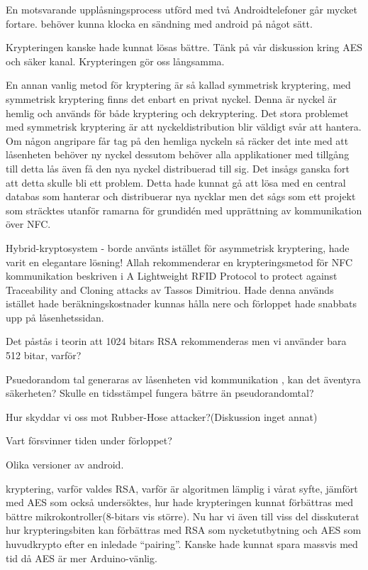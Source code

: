 \documentclass[11pt]{article}
\begin{document}
En motsvarande upplåsningsprocess utförd med två Androidtelefoner går mycket fortare. behöver kunna klocka en sändning med android på något sätt.

Krypteringen kanske hade kunnat lösas bättre. Tänk på vår diskussion kring AES och säker kanal.
Krypteringen gör oss långsamma.

En annan vanlig metod för kryptering är så kallad symmetrisk kryptering, med symmetrisk kryptering finns det enbart en privat nyckel. Denna är nyckel är hemlig och används för både kryptering och dekryptering. Det stora problemet med symmetrisk kryptering är att nyckeldistribution blir väldigt svår att hantera. Om någon angripare får tag på den hemliga nyckeln så räcker det inte med att låsenheten behöver ny nyckel dessutom behöver alla applikationer med tillgång till detta lås även få den nya nyckel distribuerad till sig. Det insågs ganska fort att detta skulle bli ett problem. Detta hade kunnat gå att lösa med en central databas som hanterar och distribuerar nya nycklar men det sågs som ett projekt som sträcktes utanför ramarna för grundidén med upprättning av kommunikation över NFC.

Hybrid-kryptosystem - borde använts istället för asymmetrisk kryptering, hade varit en elegantare lösning!
Allah rekommenderar en krypteringsmetod för NFC kommunikation beskriven i A Lightweight RFID Protocol to protect against Traceability and Cloning attacks av Tassos Dimitriou. Hade denna används istället hade beräkningskostnader kunnas hålla nere och förloppet hade snabbats upp på låsenhetssidan. 

Det påstås i teorin att 1024 bitars RSA rekommenderas men vi använder bara 512 bitar, varför?

Psuedorandom tal generaras av låsenheten vid kommunikation , kan det äventyra säkerheten? Skulle en tidsstämpel fungera bätrre än pseudorandomtal? 

Hur skyddar vi oss mot Rubber-Hose attacker?(Diskussion inget annat)

Vart försvinner tiden under förloppet?  

Olika versioner av android.

kryptering, varför valdes RSA, varför är algoritmen lämplig i vårat syfte, jämfört med AES som också undersöktes, hur hade krypteringen kunnat förbättras med bättre mikrokontroller(8-bitars vis större). Nu har vi även  till viss del disskuterat hur krypteringsbiten kan förbättras med RSA som nycketutbytning och AES som huvudkrypto efter en inledade “pairing”. Kanske hade kunnat spara massvis med tid då AES är mer Arduino-vänlig.
\end{document}
